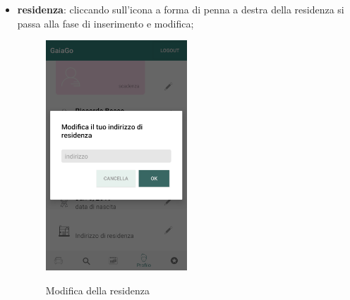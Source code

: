 \begin{itemize}
\item \textbf{residenza}: cliccando sull'icona a forma di penna a destra della residenza si passa alla fase di inserimento e modifica;
\begin{figure}[H] 
	\centering 
	\includegraphics[width=0.5\textwidth]{res/images/modifica_residenza.png}\\
	\caption{Modifica della residenza}
	\label{modifiresidenza}
\end{figure}
\pagebreak
\end{itemize}

